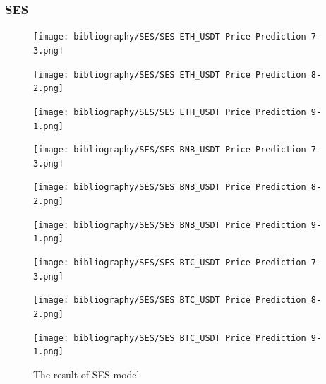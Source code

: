 \documentclass{ieeeojies}
\begin{document}
\subsubsection{SES}
\begin{figure}[H]
    \centering
    \begin{minipage}{0.15\textwidth}
    \centering
    \texttt{[image: bibliography/SES/SES ETH\_USDT Price Prediction 7-3.png]}
    \end{minipage}
    \hfill
    \begin{minipage}{0.15\textwidth}
    \centering
    \texttt{[image: bibliography/SES/SES ETH\_USDT Price Prediction 8-2.png]}
    \end{minipage}
    \hfill
    \begin{minipage}{0.15\textwidth}
    \centering
    \texttt{[image: bibliography/SES/SES ETH\_USDT Price Prediction 9-1.png]}
    \end{minipage}
    \centering
    \begin{minipage}{0.15\textwidth}
    \centering
    \texttt{[image: bibliography/SES/SES BNB\_USDT Price Prediction 7-3.png]}
    \end{minipage}
    \hfill
    \begin{minipage}{0.15\textwidth}
    \centering
    \texttt{[image: bibliography/SES/SES BNB\_USDT Price Prediction 8-2.png]}
    \end{minipage}
    \hfill
    \begin{minipage}{0.15\textwidth}
    \centering
    \texttt{[image: bibliography/SES/SES BNB\_USDT Price Prediction 9-1.png]}
    \end{minipage}
    \centering
    \begin{minipage}{0.15\textwidth}
    \centering
    \texttt{[image: bibliography/SES/SES BTC\_USDT Price Prediction 7-3.png]}
    \end{minipage}
    \hfill
    \begin{minipage}{0.15\textwidth}
    \centering
    \texttt{[image: bibliography/SES/SES BTC\_USDT Price Prediction 8-2.png]}
    \end{minipage}
    \hfill
    \begin{minipage}{0.15\textwidth}
    \centering
    \texttt{[image: bibliography/SES/SES BTC\_USDT Price Prediction 9-1.png]}
    \end{minipage}
    \caption{The result of SES model}
    \label{fig:enter-label}
\end{figure}
\end{document}

